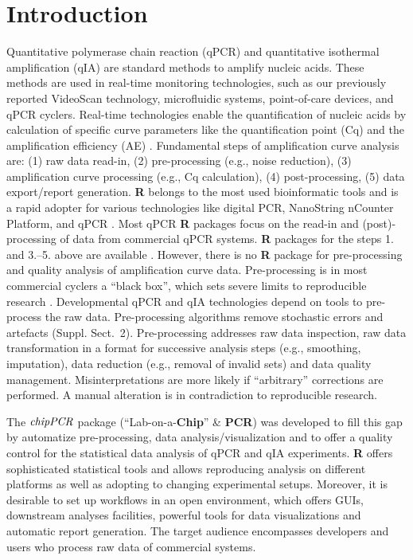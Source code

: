 \documentclass{bioinfo}
\begin{document}
\section{Introduction}

Quantitative polymerase chain reaction (qPCR) and quantitative isothermal 
amplification (qIA) are standard methods to amplify nucleic acids. These methods 
are used in real-time monitoring technologies, such as our previously reported 
VideoScan technology, microfluidic systems, point-of-care devices, and qPCR 
cyclers. Real-time technologies enable the quantification of nucleic acids by 
calculation of specific curve parameters like the quantification point (Cq) and 
the amplification efficiency (AE) 
\citep{roediger_highly_2013,rodiger_nucleic_2014,pabinger_2014}. Fundamental 
steps of amplification curve analysis are: (1) raw data read-in, (2) 
pre-processing (e.g., noise reduction), (3) amplification curve processing 
(e.g., Cq calculation), (4) post-processing, (5) data 
export/report generation. \textbf{R} belongs to the most used bioinformatic	
tools and is a rapid adopter for various technologies like digital PCR, 
NanoString nCounter Platform, and qPCR \citep{waggott_2012,pabinger_2014}. Most 
qPCR \textbf{R} packages focus on the read-in and (post)-processing of data from 
commercial qPCR systems. \textbf{R} packages for the steps 1. and 3.--5. above are 
available \citep{pabinger_2014,perkins_2012,mccall_2014,gehlenborg_2013}.
However, there is no \textbf{R} package for pre-processing and quality analysis 
of amplification curve data. Pre-processing is in most commercial cyclers a 
``black box'', which sets severe limits to reproducible research 
\citep{Leeper_2014}. Developmental qPCR and qIA technologies depend on tools to 
pre-process the raw data. Pre-processing algorithms remove stochastic errors and 
artefacts (Suppl. Sect.~2). Pre-processing addresses raw data %
inspection, raw data transformation in a format for successive analysis steps 
(e.g., smoothing, imputation), data reduction (e.g., removal of invalid sets) 
and data quality management. Misinterpretations are more likely if ``arbitrary'' 
corrections are performed. A manual alteration is in contradiction to 
reproducible research.

The $\emph{chipPCR}$ package (``Lab-on-a-\textbf{Chip}'' 
\& \textbf{PCR}) was developed to fill this gap by automatize 
pre-processing, data analysis/visualization and to offer a quality control for 
the statistical data analysis of qPCR and qIA experiments. \textbf{R} offers 
sophisticated statistical tools and allows reproducing analysis on different 
platforms as well as adopting to changing experimental setups. Moreover, it is 
desirable to set up workflows in an open environment, which offers GUIs, downstream 
analyses facilities, powerful tools for data visualizations and automatic 
report generation. The target audience encompasses developers and users who 
process raw data of commercial systems.
\end{document}
